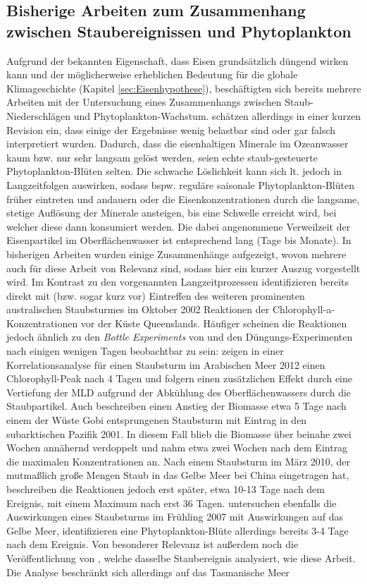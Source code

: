 \documentclass[12pt,a4paper,onecolumn]{scrartcl}
\begin{document}
\subsection{Bisherige Arbeiten zum Zusammenhang zwischen Staubereignissen und Phytoplankton}
Aufgrund der bekannten Eigenschaft, dass Eisen grundsätzlich düngend wirken kann und der möglicherweise erheblichen Bedeutung für die globale Klimageschichte (Kapitel \ref{sec:Eisenhypothese}), beschäftigten sich bereits mehrere Arbeiten mit der Untersuchung eines Zusammenhangs zwischen Staub-Niederschlägen und Phytoplankton-Wachstum. \citet{Boyd.2010} schätzen allerdings in einer kurzen Revision ein, dass einige der Ergebnisse wenig belastbar sind oder gar falsch interpretiert wurden. Dadurch, dass die eisenhaltigen Minerale im Ozeanwasser kaum bzw. nur sehr langsam gelöst werden, seien echte staub-gesteuerte Phytoplankton-Blüten selten. Die schwache Löslichkeit kann sich lt. \citet{Boyd.2010} jedoch in Langzeitfolgen auswirken, sodass bspw. reguläre saisonale Phytoplankton-Blüten früher eintreten und andauern oder die Eisenkonzentrationen durch die langsame, stetige Auflösung der Minerale ansteigen, bis eine Schwelle erreicht wird, bei welcher diese dann konsumiert werden. Die dabei angenommene Verweilzeit der Eisenpartikel im Oberflächenwasser ist entsprechend lang (Tage bis Monate). In bisherigen Arbeiten wurden einige Zusammenhänge aufgezeigt, wovon mehrere auch für diese Arbeit von Relevanz sind, sodass hier ein kurzer Auszug vorgestellt wird. Im Kontrast zu den vorgenannten Langzeitprozessen identifizieren \citet{Shaw.2008} bereits direkt mit (bzw. sogar kurz vor) Eintreffen des weiteren prominenten australischen Staubsturmes im Oktober 2002 Reaktionen der Chlorophyll-a-Konzentrationen vor der Küste Queenslands. Häufiger scheinen die Reaktionen jedoch ähnlich zu den \textit{Bottle Experiments} von \citet{Martin.1988} und den Düngungs-Experimenten \citep{Trull.2001} nach einigen wenigen Tagen beobachtbar zu sein: \citet{Bali.2019} zeigen in einer Korrelationsanalyse für einen Staubsturm im Arabischen Meer 2012 einen Chlorophyll-Peak nach 4 Tagen und folgern einen zusätzlichen Effekt durch eine Vertiefung der MLD aufgrund der Abkühlung des Oberflächenwassers durch die Staubpartikel. Auch \citet{Bishop.2002} beschreiben einen Anstieg der Biomasse etwa 5 Tage nach einem der Wüste Gobi entsprungenen Staubsturm mit Eintrag in den subarktischen Pazifik 2001. In diesem Fall blieb die Biomasse über beinahe zwei Wochen annähernd verdoppelt und nahm etwa zwei Wochen nach dem Eintrag die maximalen Konzentrationen an. Nach einem Staubsturm im März 2010, der mutmaßlich große Mengen Staub in das Gelbe Meer bei China eingetragen hat, beschreiben \citet{Tan.2014} die Reaktionen jedoch erst später, etwa 10-13 Tage nach dem Ereignis, mit einem Maximum nach erst 36 Tagen. \citet{Shi.2012} untersuchen ebenfalls die Auswirkungen eines Staubsturms im Frühling 2007 mit Auswirkungen auf das Gelbe Meer, identifizieren eine Phytoplankton-Blüte allerdings bereits 3-4 Tage nach dem Ereignis. Von besonderer Relevanz ist außerdem noch die Veröffentlichung von \citet{Gabric.2016}, welche dasselbe Staubereignis analysiert, wie  diese Arbeit. Die Analyse beschränkt sich allerdings auf das Tasmanische Meer 
\end{document}

